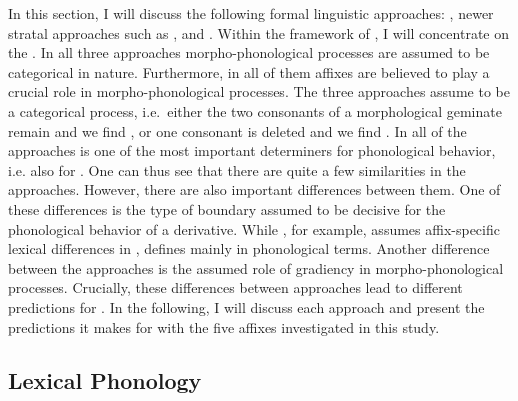 In this section, I will discuss the following formal linguistic approaches: , newer stratal approaches such as , and . Within the framework of , I will concentrate on the .  In all three approaches morpho-phonological processes are assumed to be categorical in nature. Furthermore, in all of them affixes are believed to play a crucial role in morpho-phonological processes. The three approaches assume  to be a categorical process, i.e.\ either the two consonants of a morphological geminate remain and we find , or one consonant is deleted and we find . In all of the approaches  is one of the most important determiners for phonological behavior, i.e. also for . 
One can thus see that there are quite a few similarities in the approaches. However, there are also important differences between them. One of these differences is the type of boundary assumed to be decisive for the phonological behavior of a derivative. While , for example, assumes affix-specific lexical differences in ,  defines  mainly in phonological terms. 
Another difference between the approaches is the assumed role of gradiency in morpho-phonological processes.
Crucially, these differences between approaches lead to different predictions for . In the following, I will discuss each approach and present the predictions it makes for  with the five affixes investigated in this study.


\subsection{Lexical Phonology} \label{LexPhon}


